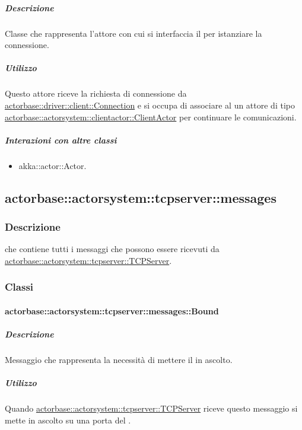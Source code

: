 \documentclass{scalatekids-article}
\begin{document}
\subparagraph{Descrizione}

Classe che rappresenta l'attore con cui si interfaccia il  per
istanziare la connessione.

\subparagraph{Utilizzo}

Questo attore riceve la richiesta di connessione da
\hyperref[sec:actorbase::driver::client::Connection]{actorbase::driver::client::Connection}
e si occupa di associare al  un attore di tipo
\hyperref[sec:actorbase::actorsystem::clientactor::ClientActor]{actorbase::actorsystem::clientactor::ClientActor}
per continuare le comunicazioni.

\subparagraph{Interazioni con altre classi}

\begin{itemize}
\item akka::actor::Actor.
\end{itemize}

\subsection{actorbase::actorsystem::tcpserver::messages}
\label{sec:actorbase::actorsystem::tcpserver::messages}

\subsubsection{Descrizione}

 che contiene tutti i messaggi che possono essere ricevuti da
\hyperref[sec:actorbase::actorsystem::tcpserver::TCPServer]{actorbase::actorsystem::tcpserver::TCPServer}.

\subsubsection{Classi}

\paragraph{actorbase::actorsystem::tcpserver::messages::Bound}
\label{sec:actorbase::actorsystem::tcpserver::messages::Bound}

\subparagraph{Descrizione}

Messaggio che rappresenta la necessità di mettere il  in ascolto.

\subparagraph{Utilizzo}

Quando \hyperref[sec:actorbase::actorsystem::tcpserver::TCPServer]{actorbase::actorsystem::tcpserver::TCPServer}
riceve questo messaggio si mette in ascolto su una porta del .
\end{document}
